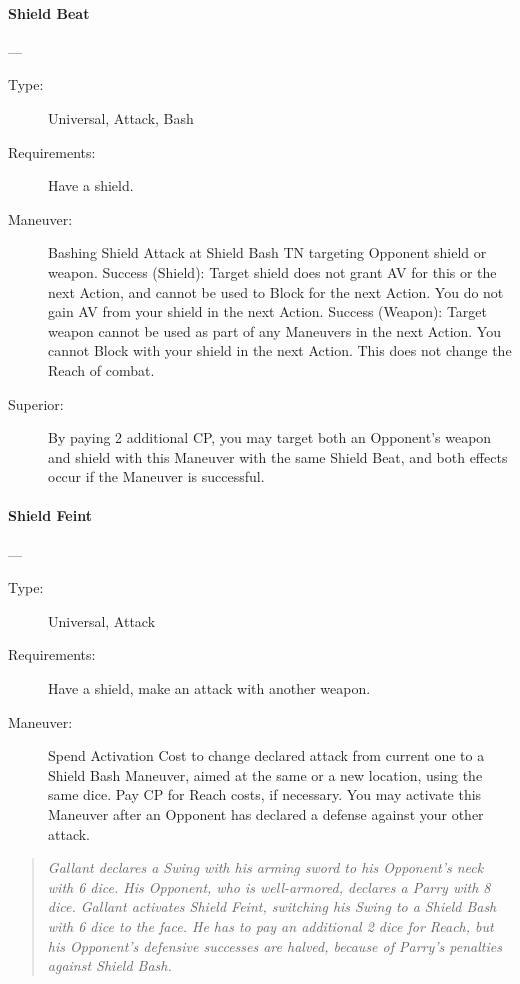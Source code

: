 \documentclass[oneside,11pt,english]{book}
\begin{document}
\paragraph{\large\label{man:Shield Beat}Shield Beat}---\quad{\large[X+2]}
\vspace{-10pt}\begin{description} 
\item [Type:] Universal, Attack, Bash 
\item [Requirements:] Have a shield.
\item [Maneuver:] Bashing Shield Attack at Shield Bash TN targeting Opponent shield or weapon. 
  Success (Shield): Target shield does not grant AV for this or the next Action, and cannot be used to Block 
  for the next Action. You do not gain AV from your shield in the next Action. 
  Success (Weapon): Target weapon cannot be used as part of any Maneuvers in the next Action. You 
  cannot Block with your shield in the next Action. This does not change the Reach of combat. 
\item [Superior:] By paying 2 additional CP, you may target both an Opponent’s weapon and shield with this 
  Maneuver with the same Shield Beat, and both effects occur if the Maneuver is successful. 
\end{description}
\paragraph{\large\label{man:Shield Feint}Shield Feint}---\quad{\large[1]}
\vspace{-10pt}\begin{description} 
\item [Type:] Universal, Attack 
\item [Requirements:] Have a shield, make an attack with another weapon. 
\item [Maneuver:] Spend Activation Cost to change declared attack from current one to a Shield Bash 
  Maneuver, aimed at the same or a new location, using the same dice. Pay CP for Reach costs, if 
  necessary. You may activate this Maneuver after an Opponent has declared a defense against your other 
  attack. 
\end{description}
\begin{quotation}
  \emph{Gallant declares a Swing with his arming sword to his Opponent’s neck with 6 dice. His Opponent, who is well-armored, 
    declares a Parry with 8 dice. Gallant activates Shield Feint, switching his Swing to a Shield Bash with 6 dice to the face. He has 
    to pay an additional 2 dice for Reach, but his Opponent’s defensive successes are halved, because of Parry’s penalties against 
    Shield Bash.}
\end{quotation}
\end{document}
